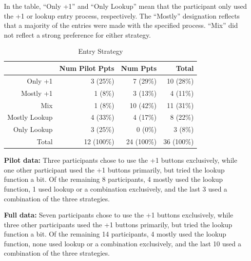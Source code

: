 In the table, ``Only +1'' and ``Only Lookup'' mean that the participant only used the +1 or lookup entry process, respectively. The ``Mostly'' designation reflects that a majority of the entries were made with the specified process. ``Mix'' did not reflect a strong preference for either strategy. 


\begin{table}[htbp]
\small
  \centering
  \caption{Entry Strategy}
    \begin{tabular}{rrrr}
    \toprule
          & Num Pilot Ppts & Num Ppts & Total \\
    \midrule
    Only +1 & 3 (25\%) & 7 (29\%) & 10 (28\%) \\
    Mostly +1 & 1 (8\%) & 3 (13\%) & 4 (11\%) \\
    Mix   & 1 (8\%) & 10 (42\%) & 11 (31\%) \\
    Mostly Lookup & 4 (33\%) & 4 (17\%) & 8 (22\%) \\
    Only Lookup & 3 (25\%) & 0 (0\%) & 3 (8\%) \\
\midrule
    Total & 12 (100\%) & 24 (100\%) & 36 (100\%) \\
    \bottomrule
    \end{tabular}%
  \label{tab:inlab_strategy}%
\end{table}%


 \textbf{Pilot data:}
Three participants chose to use the +1 buttons exclusively, while one other participant used the +1 buttons primarily, but tried the lookup function a bit. Of the remaining 8 participants, 4 mostly used the lookup function, 1 used lookup or a combination exclusively, and the last 3 used a combination of the three strategies. 

\textbf{Full data:}
Seven participants chose to use the +1 buttons exclusively, while three other participants used the +1 buttons primarily, but tried the lookup function a bit. Of the remaining 14 participants, 4 mostly used the lookup function,  none used lookup or a combination exclusively, and the last 10 used a combination of the three strategies. 


